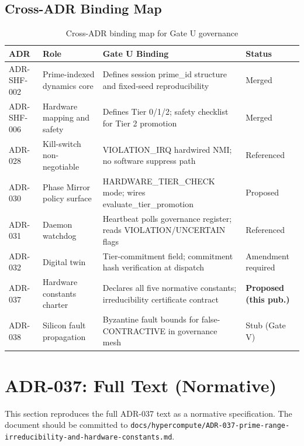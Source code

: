 \documentclass[12pt,letterpaper]{article}
\theoremstyle{plain}
\theoremstyle{definition}
\theoremstyle{remark}
\begin{document}
\subsection{Cross-ADR Binding Map}

\begin{table}[H]
\centering
\caption{Cross-ADR binding map for Gate U governance}
\label{tab:adrbindings}
\begin{tabular}{lll p{4cm}}
\toprule
\textbf{ADR} & \textbf{Role} & \textbf{Gate U Binding} & \textbf{Status} \\
\midrule
ADR-SHF-002 & Prime-indexed dynamics core    & Defines session prime\_id structure and fixed-seed reproducibility & Merged \\
ADR-SHF-006 & Hardware mapping and safety    & Defines Tier 0/1/2; safety checklist for Tier 2 promotion & Merged \\
ADR-028     & Kill-switch non-negotiable     & VIOLATION\_IRQ hardwired NMI; no software suppress path & Referenced \\
ADR-030     & Phase Mirror policy surface    & HARDWARE\_TIER\_CHECK mode; wires evaluate\_tier\_promotion & Proposed \\
ADR-031     & Daemon watchdog                & Heartbeat polls governance register; reads VIOLATION/UNCERTAIN flags & Referenced \\
ADR-032     & Digital twin                   & Tier-commitment field; commitment hash verification at dispatch & Amendment required \\
ADR-037     & Hardware constants charter     & Declares all five normative constants; irreducibility certificate contract & \textbf{Proposed (this pub.)} \\
ADR-038     & Silicon fault propagation      & Byzantine fault bounds for false-CONTRACTIVE in governance mesh & Stub (Gate V) \\
\bottomrule
\end{tabular}
\end{table}

\section{ADR-037: Full Text (Normative)}

This section reproduces the full ADR-037 text as a normative specification.
The document should be committed to
\texttt{docs/hypercompute/ADR-037-prime-range-irreducibility-and-hardware-constants.md}.
\end{document}
